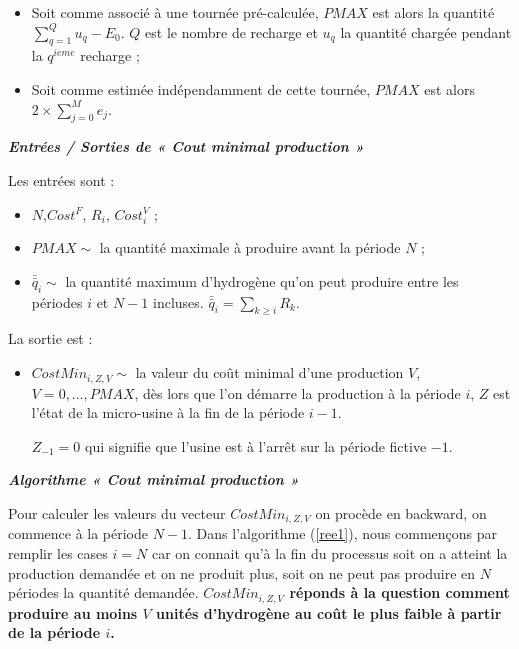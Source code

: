 \begin{itemize}[label=$\square$]
	\item Soit comme associé à une tournée pré-calculée, $PMAX$ est alors la quantité $\sum_{q=1}^{Q}u_q-E_0$. $Q$ est le nombre de recharge et $u_q$ la quantité chargée pendant la $q^{ieme}$  recharge ;
	\item Soit comme estimée indépendamment de cette tournée, $PMAX$ est alors $2 \times \sum_{j=0}^{M}e_j $.
\end{itemize} 

\textit{ \textbf{Entrées / Sorties de « Cout minimal production »}}

Les entrées sont :
\begin{itemize}[label=$\square$]
	\item $N$,$Cost^F$, $R_i$, $Cost^V_i$ ;
	\item $PMAX \sim$ la quantité maximale à produire avant la période $N$ ;
	\item $\bar{\bar{q}}_i \sim $ la quantité maximum d'hydrogène qu'on peut produire entre les périodes $i$ et $N-1$ incluses. $\bar{\bar{q}}_i=\sum_{k\geq i}R_k$.
	
\end{itemize}

La sortie est :

\begin{itemize}[label=$\square$]
	\item $ CostMin_{i,Z,V} \sim$ la valeur du coût minimal d'une production $V$, $V=0, \dots, PMAX$, dès lors que l'on démarre la production à la période $i$, $Z$ est l'état de la micro-usine à la fin de la période $i-1$.
	
	$Z_{-1} = 0$ qui signifie que l'usine est à l'arrêt sur la période fictive $-1$.
\end{itemize}

\textit{ \textbf{Algorithme « Cout minimal production »}}

Pour calculer les valeurs du vecteur $CostMin_{i,Z,V}$ on procède en backward, on commence à la période $N-1$. Dans l'algorithme (\ref{ree1}), nous commençons par remplir les cases $i=N$ car on connait qu'à la fin du processus soit on a atteint la production demandée et on ne produit plus, soit on ne peut pas produire en $N$ périodes la quantité demandée. 
\textbf{$CostMin_{i,Z,V}$ réponds à la question comment produire au moins $V$ unités d'hydrogène au coût le plus faible à partir de la période $i$.}


